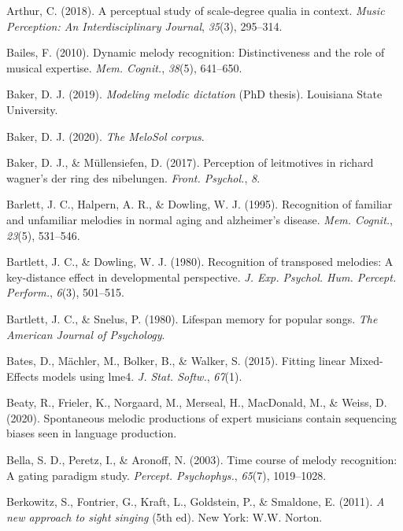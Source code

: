 \documentclass[english,man]{apa6}
\begin{document}
\leavevmode\hypertarget{ref-Arthur2018-my}{}%
Arthur, C. (2018). A perceptual study of scale-degree qualia in context. \emph{Music Perception: An Interdisciplinary Journal}, \emph{35}(3), 295--314.

\leavevmode\hypertarget{ref-Bailes2010-nh}{}%
Bailes, F. (2010). Dynamic melody recognition: Distinctiveness and the role of musical expertise. \emph{Mem. Cognit.}, \emph{38}(5), 641--650.

\leavevmode\hypertarget{ref-Baker2019-ij}{}%
Baker, D. J. (2019). \emph{Modeling melodic dictation} (PhD thesis). Louisiana State University.

\leavevmode\hypertarget{ref-Baker2020-pw}{}%
Baker, D. J. (2020). \emph{The MeloSol corpus}.

\leavevmode\hypertarget{ref-Baker2017-nt}{}%
Baker, D. J., \& Müllensiefen, D. (2017). Perception of leitmotives in richard wagner's der ring des nibelungen. \emph{Front. Psychol.}, \emph{8}.

\leavevmode\hypertarget{ref-Barlett1995-iw}{}%
Barlett, J. C., Halpern, A. R., \& Dowling, W. J. (1995). Recognition of familiar and unfamiliar melodies in normal aging and alzheimer's disease. \emph{Mem. Cognit.}, \emph{23}(5), 531--546.

\leavevmode\hypertarget{ref-Bartlett1980-yv}{}%
Bartlett, J. C., \& Dowling, W. J. (1980). Recognition of transposed melodies: A key-distance effect in developmental perspective. \emph{J. Exp. Psychol. Hum. Percept. Perform.}, \emph{6}(3), 501--515.

\leavevmode\hypertarget{ref-Bartlett1980-fc}{}%
Bartlett, J. C., \& Snelus, P. (1980). Lifespan memory for popular songs. \emph{The American Journal of Psychology}.

\leavevmode\hypertarget{ref-Bates2015-gm}{}%
Bates, D., Mächler, M., Bolker, B., \& Walker, S. (2015). Fitting linear Mixed-Effects models using lme4. \emph{J. Stat. Softw.}, \emph{67}(1).

\leavevmode\hypertarget{ref-Beaty2020-uu}{}%
Beaty, R., Frieler, K., Norgaard, M., Merseal, H., MacDonald, M., \& Weiss, D. (2020). Spontaneous melodic productions of expert musicians contain sequencing biases seen in language production.

\leavevmode\hypertarget{ref-Bella2003-cy}{}%
Bella, S. D., Peretz, I., \& Aronoff, N. (2003). Time course of melody recognition: A gating paradigm study. \emph{Percept. Psychophys.}, \emph{65}(7), 1019--1028.

\leavevmode\hypertarget{ref-Berkowitz2011-hi}{}%
Berkowitz, S., Fontrier, G., Kraft, L., Goldstein, P., \& Smaldone, E. (2011). \emph{A new approach to sight singing} (5th ed). New York: W.W. Norton.
\end{document}
